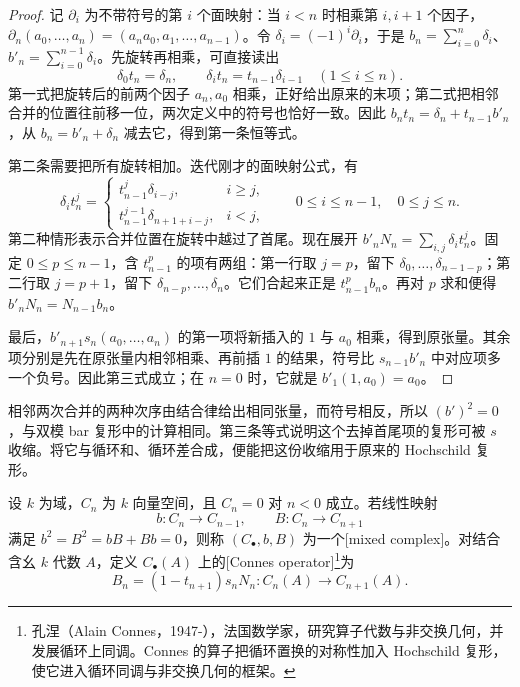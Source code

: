 \begin{proof}
	记 \(\partial_i\) 为不带符号的第 \(i\) 个面映射：当 \(i<n\) 时相乘第 \(i,i+1\) 个因子，\(\partial_n(a_0,\ldots,a_n)=(a_n a_0,a_1,\ldots,a_{n-1})\)。令 \(\delta_i=(-1)^i \partial_i\)，于是 \(b_n=\sum_{i=0}^n\delta_i\)、\(b'_n=\sum_{i=0}^{n-1}\delta_i\)。先旋转再相乘，可直接读出
	\[
		\delta_0t_n=\delta_n,\qquad \delta_i t_n=t_{n-1}\delta_{i-1}\quad(1\le i\le n).
	\]
	第一式把旋转后的前两个因子 \(a_n,a_0\) 相乘，正好给出原来的末项；第二式把相邻合并的位置往前移一位，两次定义中的符号也恰好一致。因此 \(b_n t_n=\delta_n+t_{n-1}b'_n\)，从 \(b_n=b'_n+\delta_n\) 减去它，得到第一条恒等式。

	第二条需要把所有旋转相加。迭代刚才的面映射公式，有
	\[
		\delta_i t_n^j=
		\begin{cases}
			t_{n-1}^j\delta_{i-j},&i\ge j,\\
			t_{n-1}^{j-1}\delta_{n+1+i-j},&i<j,
		\end{cases}
		\qquad 0\le i\le n-1,\quad 0\le j\le n.
	\]
	第二种情形表示合并位置在旋转中越过了首尾。现在展开 \(b'_nN_n=\sum_{i,j}\delta_i t_n^j\)。固定 \(0\le p\le n-1\)，含 \(t_{n-1}^p\) 的项有两组：第一行取 \(j=p\)，留下 \(\delta_0,\ldots,\delta_{n-1-p}\)；第二行取 \(j=p+1\)，留下 \(\delta_{n-p},\ldots,\delta_n\)。它们合起来正是 \(t_{n-1}^p b_n\)。再对 \(p\) 求和便得 \(b'_nN_n=N_{n-1}b_n\)。

	最后，\(b'_{n+1}s_n(a_0,\ldots,a_n)\) 的第一项将新插入的 \(1\) 与 \(a_0\) 相乘，得到原张量。其余项分别是先在原张量内相邻相乘、再前插 \(1\) 的结果，符号比 \(s_{n-1}b'_n\) 中对应项多一个负号。因此第三式成立；在 \(n=0\) 时，它就是 \(b'_1(1,a_0)=a_0\)。
\end{proof}

相邻两次合并的两种次序由结合律给出相同张量，而符号相反，所以 \((b')^2=0\)，与双模 bar 复形中的计算相同。第三条等式说明这个去掉首尾项的复形可被 \(s\) 收缩。将它与循环和、循环差合成，便能把这份收缩用于原来的 Hochschild 复形。

\begin{definition}\label{b4:def:mixed-complex}
	设 \(k\) 为域，\(C_n\) 为 \(k\) 向量空间，且 \(C_n=0\) 对 \(n<0\) 成立。若线性映射
	\[
		b:C_n\longrightarrow C_{n-1},\qquad B:C_n\longrightarrow C_{n+1}
	\]
	满足 \(b^2=B^2=bB+Bb=0\)，则称 \((C_\bullet,b,B)\) 为一个[mixed complex]。对结合含幺 \(k\) 代数 \(A\)，定义 \(C_\bullet(A)\) 上的[Connes operator]\footnote{孔涅（Alain Connes，1947-），法国数学家，研究算子代数与非交换几何，并发展循环上同调。Connes 的算子把循环置换的对称性加入 Hochschild 复形，使它进入循环同调与非交换几何的框架。}为
	\begin{equation}\label{b4:eq:connes-operator}
		B_n=(1-t_{n+1})s_nN_n:C_n(A)\longrightarrow C_{n+1}(A).
	\end{equation}
\end{definition}

